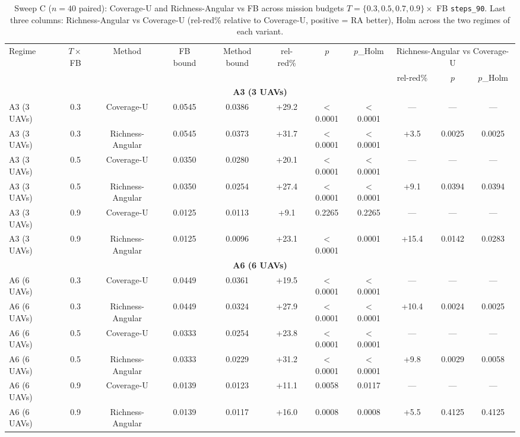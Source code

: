 \documentclass[journal]{IEEEtran}
\newcommand{\CU}{Coverage-U}
\newcommand{\RA}{Richness-Angular}
\begin{document}
\begin{table}[t]
\caption{Sweep C ($n = 40$ paired): \CU{} and \RA{} vs FB across mission budgets $T = \{0.3, 0.5, 0.7, 0.9\} \times$ FB \texttt{steps\_90}. Last three columns: \RA{} vs \CU{} (rel-red\% relative to \CU{}, positive = RA better), Holm across the two regimes of each variant.}
\label{tab:sweepC}
\centering
\begin{tabular}{l c c c c c c c c c c}
\toprule
Regime & $T{\times}$FB & Method & FB bound & Method bound & rel-red\% & $p$ & $p$\_Holm & \multicolumn{3}{c}{\RA{} vs \CU{}} \\
\cmidrule(lr){9-11}
& & & & & & & & rel-red\% & $p$ & $p$\_Holm \\
\midrule
\multicolumn{11}{c}{\textbf{A3 (3 UAVs)}} \\
\midrule
A3 (3 UAVs) & 0.3 & \CU & 0.0545 & 0.0386 & +29.2 & $<$0.0001 & $<$0.0001 & --- & --- & --- \\
A3 (3 UAVs) & 0.3 & \RA & 0.0545 & 0.0373 & +31.7 & $<$0.0001 & $<$0.0001 & +3.5 & 0.0025 & 0.0025 \\
A3 (3 UAVs) & 0.5 & \CU & 0.0350 & 0.0280 & +20.1 & $<$0.0001 & $<$0.0001 & --- & --- & --- \\
A3 (3 UAVs) & 0.5 & \RA & 0.0350 & 0.0254 & +27.4 & $<$0.0001 & $<$0.0001 & +9.1 & 0.0394 & 0.0394 \\
A3 (3 UAVs) & 0.9 & \CU & 0.0125 & 0.0113 & +9.1 & 0.2265 & 0.2265 & --- & --- & --- \\
A3 (3 UAVs) & 0.9 & \RA & 0.0125 & 0.0096 & +23.1 & $<$0.0001 & 0.0001 & +15.4 & 0.0142 & 0.0283 \\
\multicolumn{11}{c}{\textbf{A6 (6 UAVs)}} \\
\midrule
A6 (6 UAVs) & 0.3 & \CU & 0.0449 & 0.0361 & +19.5 & $<$0.0001 & $<$0.0001 & --- & --- & --- \\
A6 (6 UAVs) & 0.3 & \RA & 0.0449 & 0.0324 & +27.9 & $<$0.0001 & $<$0.0001 & +10.4 & 0.0024 & 0.0025 \\
A6 (6 UAVs) & 0.5 & \CU & 0.0333 & 0.0254 & +23.8 & $<$0.0001 & $<$0.0001 & --- & --- & --- \\
A6 (6 UAVs) & 0.5 & \RA & 0.0333 & 0.0229 & +31.2 & $<$0.0001 & $<$0.0001 & +9.8 & 0.0029 & 0.0058 \\
A6 (6 UAVs) & 0.9 & \CU & 0.0139 & 0.0123 & +11.1 & 0.0058 & 0.0117 & --- & --- & --- \\
A6 (6 UAVs) & 0.9 & \RA & 0.0139 & 0.0117 & +16.0 & 0.0008 & 0.0008 & +5.5 & 0.4125 & 0.4125 \\
\bottomrule
\end{tabular}
\end{table}
\end{document}
